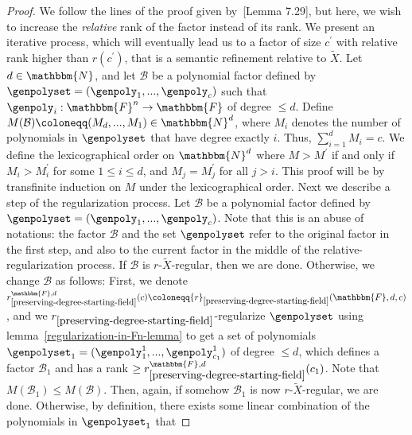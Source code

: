 \documentclass[10pt,a4paper]{article}
\newcommand{\definedas}[0]{\coloneqq}
\newcommand{\basefield}[0]{\mathbbm{F}}
\newcommand{\blocklength}[0]{n}
\newcommand{\field}[0]{\basefield^{\blocklength}}
\newcommand{\degree}[0]{d}
\newcommand{\funcdef}[3]{#1:#2\rightarrow#3}
\newcommand{\factor}[0]{\mathcal{B}}
\newcommand{\naturalnumbersset}[0]{\mathbbm{N}}
\newcommand{\variety}{{\tilde{X}}}
\newcommand{\rankfunc}[0]{{{{r}}}}
\begin{document}
\begin{proof}
    We follow the lines of the proof given by~\cite{book}[Lemma 7.29], but here, we wish to increase the \emph{relative} rank of the factor instead of its rank.
    We present an iterative process, which will eventually lead us to a factor of size $c^{\prime}$ with relative rank higher than $\rankfunc(c^\prime)$,
    that is a semantic refinement relative to $\variety$.
    Let $\degree \in \naturalnumbersset$,
    and let $\factor$ be a polynomial factor defined by $\genpolyset = (\genpoly_1,...,\genpoly_c)$ such that $\funcdef{\genpoly_i}{\field}{\basefield}$ of degree $\leq \degree$.
    Define $M(\factor) \definedas (M_{\degree},...,M_1) \in \naturalnumbersset^{\degree}$,
    where $M_i$ denotes the number of polynomials in $\genpolyset$ that have degree exactly $i$.
    Thus, $\sum_{i=1}^{\degree}M_i = c$.
    We define the lexicographical order on $\naturalnumbersset^{\degree}$ where $M > M^{\prime}$ if and only if $M_i > M^{\prime}_i$ for some $1 \leq i \leq \degree$,
    and $M_j = M^{\prime}_j$ for all $j > i$.
    This proof will be by transfinite induction on $M$ under the lexicographical order.
    Next we describe a step of the regularization process.
    \newline
    Let $\factor$ be a polynomial factor defined by $\genpolyset = (\genpoly_1,...,\genpoly_c)$.
    Note that this is an abuse of notations: the factor $\factor$ and the set $\genpolyset$ refer to the original factor in the first step, and also to the current factor in the middle of the relative-regularization process.
    If $\factor$ is $\rankfunc$-$\variety$-regular, then we are done.
    Otherwise, we change $\factor$ as follows:
    First, we denote $\rankfunc_{\ref{preserving-degree-starting-field}}^{\basefield, \degree}(c) \definedas \rankfunc_{\ref{preserving-degree-starting-field}}(\basefield, \degree, c)$,
    and we $\rankfunc_{\ref{preserving-degree-starting-field}}$-regularize $\genpolyset$ using lemma~\ref{regularization-in-Fn-lemma}
    to get a set of polynomials $\genpolyset_1 = (\genpoly^1_1,...,\genpoly^1_{c_1})$ of degree $\leq \degree$,
    which defines a factor $\factor_1$ and has a rank $\geq \rankfunc_{\ref{preserving-degree-starting-field}}^{\basefield, \degree}(c_1)$.
    Note that $M(\factor_1) \leq M(\factor)$.
    Then, again, if somehow $\factor_1$ is now $\rankfunc$-$\variety$-regular, we are done.
    \newline
    Otherwise, by definition, there exists some linear combination of the polynomials in $\genpolyset_{1}$ that

\end{proof}
\end{document}
